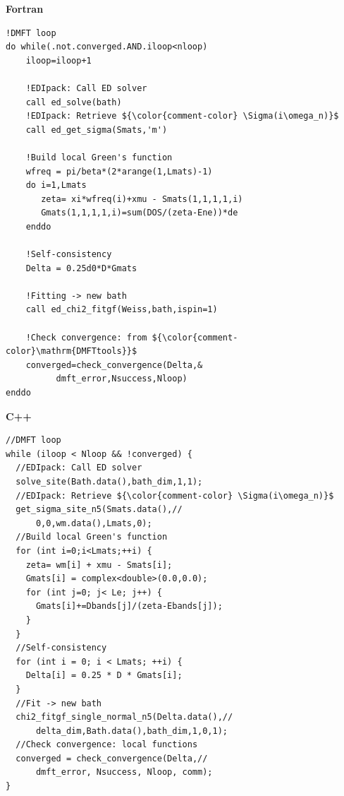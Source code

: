 \documentclass[edipack_sp.tex]{subfiles}
\begin{document}
\begin{center} 
\begin{minipage}[t]{0.49\linewidth}
\textbf{Fortran}
\begin{lstlisting}[style=fstyle,frame=none,numbers=none,basicstyle={\scriptsize\ttfamily}]
!DMFT loop
do while(.not.converged.AND.iloop<nloop)
    iloop=iloop+1     
    
    !EDIpack: Call ED solver
    call ed_solve(bath)     
    !EDIpack: Retrieve ${\color{comment-color} \Sigma(i\omega_n)}$
    call ed_get_sigma(Smats,'m')
    
    !Build local Green's function
    wfreq = pi/beta*(2*arange(1,Lmats)-1)
    do i=1,Lmats
       zeta= xi*wfreq(i)+xmu - Smats(1,1,1,1,i)
       Gmats(1,1,1,1,i)=sum(DOS/(zeta-Ene))*de  
    enddo    
    
    !Self-consistency
    Delta = 0.25d0*D*Gmats
    
    !Fitting -> new bath
    call ed_chi2_fitgf(Weiss,bath,ispin=1)    
    
    !Check convergence: from ${\color{comment-color}\mathrm{DMFTtools}}$
    converged=check_convergence(Delta,&
          dmft_error,Nsuccess,Nloop)          
enddo
\end{lstlisting}
\end{minipage}
%
\begin{minipage}[t]{0.49\linewidth}
\textbf{C++}
\begin{lstlisting}[style=cstyle,frame=none,numbers=none,basicstyle={\scriptsize\ttfamily}]
//DMFT loop
while (iloop < Nloop && !converged) {
  //EDIpack: Call ED solver
  solve_site(Bath.data(),bath_dim,1,1);      
  //EDIpack: Retrieve ${\color{comment-color} \Sigma(i\omega_n)}$
  get_sigma_site_n5(Smats.data(),//
      0,0,wm.data(),Lmats,0);
  //Build local Green's function
  for (int i=0;i<Lmats;++i) {
    zeta= wm[i] + xmu - Smats[i];
    Gmats[i] = complex<double>(0.0,0.0);
    for (int j=0; j< Le; j++) {
      Gmats[i]+=Dbands[j]/(zeta-Ebands[j]);
    }
  }
  //Self-consistency
  for (int i = 0; i < Lmats; ++i) {
    Delta[i] = 0.25 * D * Gmats[i];
  }
  //Fit -> new bath
  chi2_fitgf_single_normal_n5(Delta.data(),//
      delta_dim,Bath.data(),bath_dim,1,0,1);
  //Check convergence: local functions
  converged = check_convergence(Delta,//
      dmft_error, Nsuccess, Nloop, comm);  
}
\end{lstlisting}
\end{minipage}
\end{center}
\end{document}
